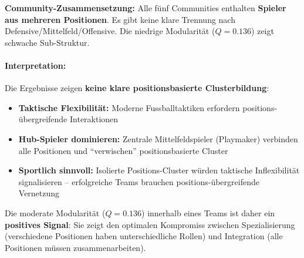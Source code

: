 \textbf{Community-Zusammensetzung:}
Alle fünf Communities enthalten \textbf{Spieler aus mehreren Positionen}. Es gibt keine klare Trennung nach Defensive/Mittelfeld/Offensive. Die niedrige Modularität ($Q = 0.136$) zeigt schwache Sub-Struktur.

\paragraph{Interpretation:}
Die Ergebnisse zeigen \textbf{keine klare positionsbasierte Clusterbildung}:
\begin{itemize}
  \item \textbf{Taktische Flexibilität:} Moderne Fussballtaktiken erfordern positions-übergreifende Interaktionen
  \item \textbf{Hub-Spieler dominieren:} Zentrale Mittelfeldspieler (Playmaker) verbinden alle Positionen und \enquote{verwischen} positionsbasierte Cluster
  \item \textbf{Sportlich sinnvoll:} Isolierte Positions-Cluster würden taktische Inflexibilität signalisieren -- erfolgreiche Teams brauchen positions-übergreifende Vernetzung
\end{itemize}

Die moderate Modularität ($Q = 0.136$) innerhalb eines Teams ist daher ein \textbf{positives Signal}: Sie zeigt den optimalen Kompromiss zwischen Spezialisierung (verschiedene Positionen haben unterschiedliche Rollen) und Integration (alle Positionen müssen zusammenarbeiten).
